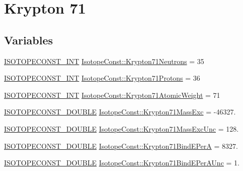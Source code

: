\hypertarget{group___isotope_const-_krypton-_kr71}{}\section{Krypton 71}
\label{group___isotope_const-_krypton-_kr71}
\subsection*{Variables}
\begin{DoxyCompactItemize}
\item 
\mbox{\hyperlink{group___isotope_const-_macros_ga5f18360b3e99483a35c32d789e62621c}{I\+S\+O\+T\+O\+P\+E\+C\+O\+N\+S\+T\+\_\+\+I\+NT}} \mbox{\hyperlink{group___isotope_const-_krypton-_kr71_ga775455ed6ff17e0fe8b4921403391b10}{Isotope\+Const\+::\+Krypton71\+Neutrons}} = 35
\item 
\mbox{\hyperlink{group___isotope_const-_macros_ga5f18360b3e99483a35c32d789e62621c}{I\+S\+O\+T\+O\+P\+E\+C\+O\+N\+S\+T\+\_\+\+I\+NT}} \mbox{\hyperlink{group___isotope_const-_krypton-_kr71_gaa31cc924513449f6746aff91ae1f207a}{Isotope\+Const\+::\+Krypton71\+Protons}} = 36
\item 
\mbox{\hyperlink{group___isotope_const-_macros_ga5f18360b3e99483a35c32d789e62621c}{I\+S\+O\+T\+O\+P\+E\+C\+O\+N\+S\+T\+\_\+\+I\+NT}} \mbox{\hyperlink{group___isotope_const-_krypton-_kr71_ga05b7b25b3899053052d1b1aff716d26f}{Isotope\+Const\+::\+Krypton71\+Atomic\+Weight}} = 71
\item 
\mbox{\hyperlink{group___isotope_const-_macros_ga8f45a7272ce02c0b4c65c44636ed719a}{I\+S\+O\+T\+O\+P\+E\+C\+O\+N\+S\+T\+\_\+\+D\+O\+U\+B\+LE}} \mbox{\hyperlink{group___isotope_const-_krypton-_kr71_ga016f9015ef9428b820e383831f041ac7}{Isotope\+Const\+::\+Krypton71\+Mass\+Exc}} = -\/46327.
\item 
\mbox{\hyperlink{group___isotope_const-_macros_ga8f45a7272ce02c0b4c65c44636ed719a}{I\+S\+O\+T\+O\+P\+E\+C\+O\+N\+S\+T\+\_\+\+D\+O\+U\+B\+LE}} \mbox{\hyperlink{group___isotope_const-_krypton-_kr71_gacfe783f62e836321aa2eca4a282f6f05}{Isotope\+Const\+::\+Krypton71\+Mass\+Exc\+Unc}} = 128.
\item 
\mbox{\hyperlink{group___isotope_const-_macros_ga8f45a7272ce02c0b4c65c44636ed719a}{I\+S\+O\+T\+O\+P\+E\+C\+O\+N\+S\+T\+\_\+\+D\+O\+U\+B\+LE}} \mbox{\hyperlink{group___isotope_const-_krypton-_kr71_gaf903a28a63fadc3ec5b9c4b80a86006e}{Isotope\+Const\+::\+Krypton71\+Bind\+E\+PerA}} = 8327.
\item 
\mbox{\hyperlink{group___isotope_const-_macros_ga8f45a7272ce02c0b4c65c44636ed719a}{I\+S\+O\+T\+O\+P\+E\+C\+O\+N\+S\+T\+\_\+\+D\+O\+U\+B\+LE}} \mbox{\hyperlink{group___isotope_const-_krypton-_kr71_gad100c5cde748a990b288e2faa513e37c}{Isotope\+Const\+::\+Krypton71\+Bind\+E\+Per\+A\+Unc}} = 1.

\end{DoxyCompactItemize}
